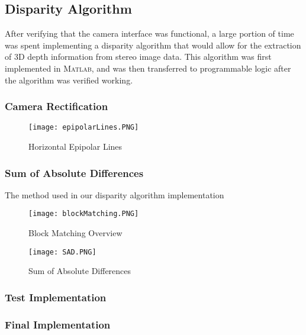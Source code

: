 \subsection{Disparity Algorithm}
After verifying that the camera interface was functional, a large portion of time was spent implementing a disparity algorithm that would allow for the extraction of 3D depth information from stereo image data. This algorithm was first implemented in \textsc{Matlab}, and was then transferred to programmable logic after the algorithm was verified working. 
\subsubsection{Camera Rectification}
\begin{figure}[H]
	\centerline{\texttt{[image: epipolarLines.PNG]}}
	\caption{Horizontal Epipolar Lines \cite{collins}}
	\label{epipolarLines}
\end{figure}

\subsubsection{Sum of Absolute Differences}
The method used in our disparity algorithm implementation
\begin{figure}[H]
	\centerline{\texttt{[image: blockMatching.PNG]}}
	\caption{Block Matching Overview \cite{collins}}
	\label{blockMatching}
\end{figure}
\begin{figure}[H]
	\centerline{\texttt{[image: SAD.PNG]}}
	\caption{Sum of Absolute Differences \cite{mccormick}}
	\label{SAD}
\end{figure}

\subsubsection{Test Implementation}
\subsubsection{Final Implementation}